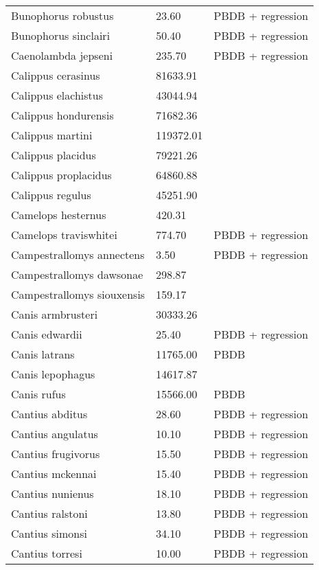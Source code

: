 \documentclass{article}
\begin{document}
\begin{center}
\begin{longtable}{p{} p{} p{}}
    Bunophorus robustus & 23.60 & PBDB + regression \\ 
    Bunophorus sinclairi & 50.40 & PBDB + regression \\ 
    Caenolambda jepseni & 235.70 & PBDB + regression \\ 
    Calippus cerasinus & 81633.91 & \cite{Tomiya2013} \\ 
    Calippus elachistus & 43044.94 & \cite{Tomiya2013} \\ 
    Calippus hondurensis & 71682.36 & \cite{Tomiya2013} \\ 
    Calippus martini & 119372.01 & \cite{Tomiya2013} \\ 
    Calippus placidus & 79221.26 & \cite{Tomiya2013} \\ 
    Calippus proplacidus & 64860.88 & \cite{Tomiya2013} \\ 
    Calippus regulus & 45251.90 & \cite{Tomiya2013} \\ 
    Camelops hesternus & 420.31 & \cite{Smith2004} \\ 
    Camelops traviswhitei & 774.70 & PBDB + regression \\ 
    Campestrallomys annectens & 3.50 & PBDB + regression \\ 
    Campestrallomys dawsonae & 298.87 & \cite{Tomiya2013} \\ 
    Campestrallomys siouxensis & 159.17 & \cite{Tomiya2013} \\ 
    Canis armbrusteri & 30333.26 & \cite{Tomiya2013} \\ 
    Canis edwardii & 25.40 & PBDB + regression \\ 
    Canis latrans & 11765.00 & PBDB \\ 
    Canis lepophagus & 14617.87 & \cite{Tomiya2013} \\ 
    Canis rufus & 15566.00 & PBDB \\ 
    Cantius abditus & 28.60 & PBDB + regression \\ 
    Cantius angulatus & 10.10 & PBDB + regression \\ 
    Cantius frugivorus & 15.50 & PBDB + regression \\ 
    Cantius mckennai & 15.40 & PBDB + regression \\ 
    Cantius nunienus & 18.10 & PBDB + regression \\ 
    Cantius ralstoni & 13.80 & PBDB + regression \\ 
    Cantius simonsi & 34.10 & PBDB + regression \\ 
    Cantius torresi & 10.00 & PBDB + regression \\ 

\end{longtable}
\end{center}
\end{document}
